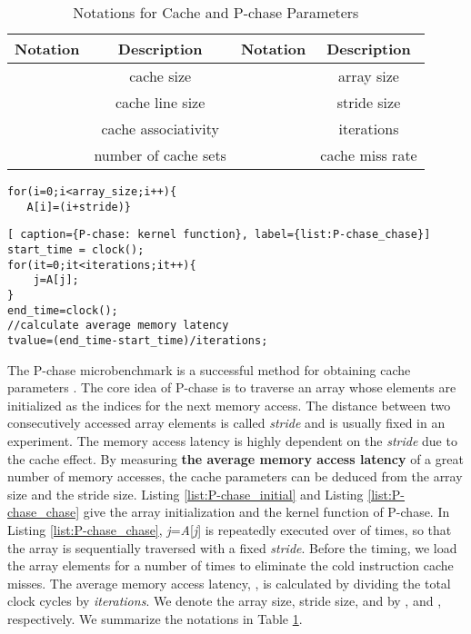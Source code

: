 \documentclass[10pt,journal,compsoc]{IEEEtran}
\theoremstyle{definition}
\begin{document}
\begin{table}\centering
\caption{Notations for Cache and P-chase Parameters}
\label{tab:notation}
    \begin{tabular}{|c|c ||c|c |}
    \hline
    Notation & Description & Notation & Description\\
    \hline
     & cache size &  & array size \\
     & cache line size &  & stride size \\
     & cache associativity &  & iterations \\
     & number of cache sets &  & cache miss rate \\
    \hline
    \end{tabular}
\end{table}

\renewcommand{\thelstlisting}{\arabic{lstlisting}}
\begin{lstlisting}[caption={P-chase: array initialization}, label={list:P-chase_initial}]
for(i=0;i<array_size;i++){
   A[i]=(i+stride)}
\end{lstlisting}

\renewcommand{\thelstlisting}{\arabic{lstlisting}}
\begin{lstlisting}[ caption={P-chase: kernel function}, label={list:P-chase_chase}]
start_time = clock();
for(it=0;it<iterations;it++){
    j=A[j];
}
end_time=clock();
//calculate average memory latency
tvalue=(end_time-start_time)/iterations;
\end{lstlisting}

The P-chase microbenchmark is a successful method for obtaining cache parameters \cite{saavedra1992cpu,saavedra1995measuring,mcvoy1996lmbench,volkov2008benchmarking,
papadopoulou2009micro,wong2010demystifying,baghsorkhi2012efficient,meltzer2013micro}. The core idea of P-chase is to traverse an array whose elements are initialized as the indices for the next memory access. The distance between two consecutively accessed array elements is called \emph{stride} and is usually fixed in an experiment. The memory access latency is highly dependent on the \emph{stride} due to the cache effect. By measuring \textbf{the average memory access latency} of a great number of memory accesses, the cache parameters can be deduced from the array size and the stride size. Listing \ref{list:P-chase_initial} and Listing \ref{list:P-chase_chase} give the array initialization and the kernel function of P-chase. In Listing \ref{list:P-chase_chase}, \emph{j}=\emph{A}[\emph{j}] is repeatedly executed over  of times, so that the array  is sequentially traversed with a fixed \emph{stride}. Before the timing, we load the array elements for a number of times to eliminate the cold instruction cache misses. The average memory access latency, , is calculated by dividing the total clock cycles by \emph{iterations}. We denote the array size, stride size, and  by ,  and , respectively. We summarize the notations in Table \ref{tab:notation}.
\end{document}
